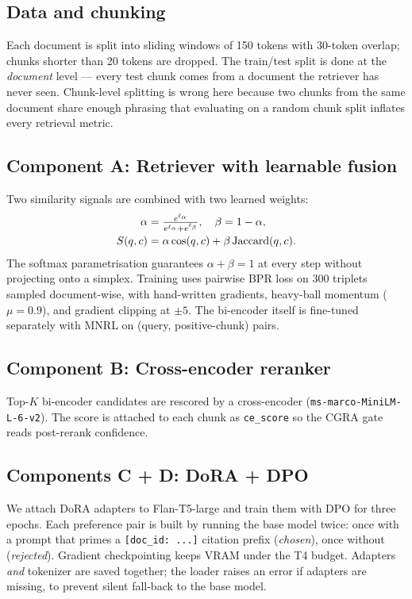 \documentclass[11pt,a4paper]{article}
\begin{document}
\subsection{Data and chunking}
Each document is split into sliding windows of 150 tokens with 30-token overlap; chunks shorter than 20 tokens are dropped. The train/test split is done at the \emph{document} level --- every test chunk comes from a document the retriever has never seen. Chunk-level splitting is wrong here because two chunks from the same document share enough phrasing that evaluating on a random chunk split inflates every retrieval metric.

\subsection{Component A: Retriever with learnable fusion}
\label{sec:retriever}
Two similarity signals are combined with two learned weights:
\begin{align*}
\small
\alpha &= \tfrac{e^{\ell_\alpha}}{e^{\ell_\alpha}+e^{\ell_\beta}}, \quad \beta = 1-\alpha,\\[-1pt]
S(q,c) &= \alpha\cos(q,c)+\beta\,\mathrm{Jaccard}(q,c).
\end{align*}
The softmax parametrisation guarantees $\alpha+\beta=1$ at every step without projecting onto a simplex. Training uses pairwise BPR loss on 300 triplets sampled document-wise, with hand-written gradients, heavy-ball momentum ($\mu{=}0.9$), and gradient clipping at $\pm 5$. The bi-encoder itself is fine-tuned separately with MNRL on (query, positive-chunk) pairs.

\subsection{Component B: Cross-encoder reranker}
Top-$K$ bi-encoder candidates are rescored by a cross-encoder (\texttt{ms-marco-MiniLM-L-6-v2}). The score is attached to each chunk as \texttt{ce\_score} so the CGRA gate reads post-rerank confidence.

\subsection{Components C + D: DoRA + DPO}
We attach DoRA adapters to Flan-T5-large and train them with DPO for three epochs. Each preference pair is built by running the base model twice: once with a prompt that primes a \texttt{[doc\_id:~...]} citation prefix (\emph{chosen}), once without (\emph{rejected}). Gradient checkpointing keeps VRAM under the T4 budget. Adapters \emph{and} tokenizer are saved together; the loader raises an error if adapters are missing, to prevent silent fall-back to the base model.
\end{document}
